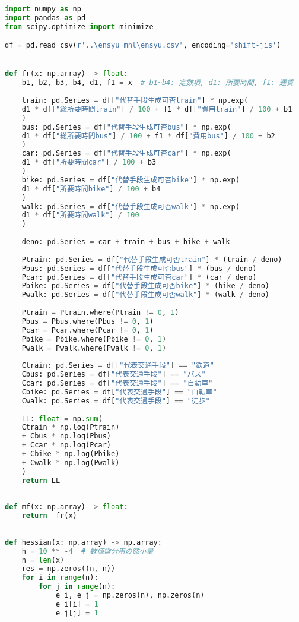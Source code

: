 \begin{lstlisting}[language=Python]
import numpy as np
import pandas as pd
from scipy.optimize import minimize

df = pd.read_csv(r'..\ensyu_mnl\ensyu.csv', encoding='shift-jis')


def fr(x: np.array) -> float:
    b1, b2, b3, b4, d1, f1 = x  # b1~b4: 定数項, d1: 所要時間, f1: 運賃
    
    train: pd.Series = df["代替手段生成可否train"] * np.exp(
    d1 * df["総所要時間train"] / 100 + f1 * df["費用train"] / 100 + b1
    )
    bus: pd.Series = df["代替手段生成可否bus"] * np.exp(
    d1 * df["総所要時間bus"] / 100 + f1 * df["費用bus"] / 100 + b2
    )
    car: pd.Series = df["代替手段生成可否car"] * np.exp(
    d1 * df["所要時間car"] / 100 + b3
    )
    bike: pd.Series = df["代替手段生成可否bike"] * np.exp(
    d1 * df["所要時間bike"] / 100 + b4
    )
    walk: pd.Series = df["代替手段生成可否walk"] * np.exp(
    d1 * df["所要時間walk"] / 100
    )
    
    deno: pd.Series = car + train + bus + bike + walk
    
    Ptrain: pd.Series = df["代替手段生成可否train"] * (train / deno)
    Pbus: pd.Series = df["代替手段生成可否bus"] * (bus / deno)
    Pcar: pd.Series = df["代替手段生成可否car"] * (car / deno)
    Pbike: pd.Series = df["代替手段生成可否bike"] * (bike / deno)
    Pwalk: pd.Series = df["代替手段生成可否walk"] * (walk / deno)
    
    Ptrain = Ptrain.where(Ptrain != 0, 1)
    Pbus = Pbus.where(Pbus != 0, 1)
    Pcar = Pcar.where(Pcar != 0, 1)
    Pbike = Pbike.where(Pbike != 0, 1)
    Pwalk = Pwalk.where(Pwalk != 0, 1)
    
    Ctrain: pd.Series = df["代表交通手段"] == "鉄道"
    Cbus: pd.Series = df["代表交通手段"] == "バス"
    Ccar: pd.Series = df["代表交通手段"] == "自動車"
    Cbike: pd.Series = df["代表交通手段"] == "自転車"
    Cwalk: pd.Series = df["代表交通手段"] == "徒歩"
    
    LL: float = np.sum(
    Ctrain * np.log(Ptrain)
    + Cbus * np.log(Pbus)
    + Ccar * np.log(Pcar)
    + Cbike * np.log(Pbike)
    + Cwalk * np.log(Pwalk)
    )
    return LL
    
    
def mf(x: np.array) -> float:
    return -fr(x)
    
    
def hessian(x: np.array) -> np.array:
    h = 10 ** -4  # 数値微分用の微小量
    n = len(x)
    res = np.zeros((n, n))
    for i in range(n):
        for j in range(n):
            e_i, e_j = np.zeros(n), np.zeros(n)
            e_i[i] = 1
            e_j[j] = 1
            

\end{lstlisting}
